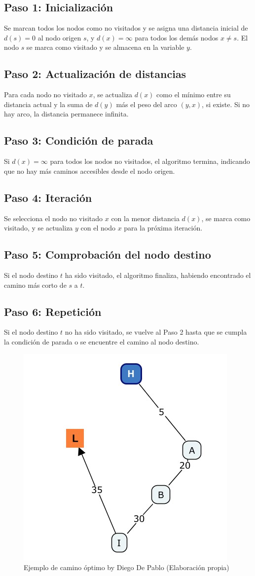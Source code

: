 \subsection*{Paso 1: Inicialización}
Se marcan todos los nodos como no visitados y se asigna una distancia inicial de $d(s) = 0$ al nodo origen $s$, y $d(x) = \infty$ para todos los demás nodos $x \neq s$. El nodo $s$ se marca como visitado y se almacena en la variable $y$.

\subsection*{Paso 2: Actualización de distancias}
Para cada nodo no visitado $x$, se actualiza $d(x)$ como el mínimo entre su distancia actual y la suma de $d(y)$ más el peso del arco $(y, x)$, si existe. Si no hay arco, la distancia permanece infinita.

\subsection*{Paso 3: Condición de parada}
Si $d(x) = \infty$ para todos los nodos no visitados, el algoritmo termina, indicando que no hay más caminos accesibles desde el nodo origen.

\subsection*{Paso 4: Iteración}
Se selecciona el nodo no visitado $x$ con la menor distancia $d(x)$, se marca como visitado, y se actualiza $y$ con el nodo $x$ para la próxima iteración.

\subsection*{Paso 5: Comprobación del nodo destino}
Si el nodo destino $t$ ha sido visitado, el algoritmo finaliza, habiendo encontrado el camino más corto de $s$ a $t$.

\subsection*{Paso 6: Repetición}
Si el nodo destino $t$ no ha sido visitado, se vuelve al Paso 2 hasta que se cumpla la condición de parada o se encuentre el camino al nodo destino.

\begin{figure}[h]
	\centering \includegraphics[width=0.38\linewidth]{img/Solucion_final_6.jpg}
	\caption{Ejemplo de camino óptimo by Diego De Pablo (Elaboración propia)}
	\label{fig:etiqueta1}
\end{figure}

